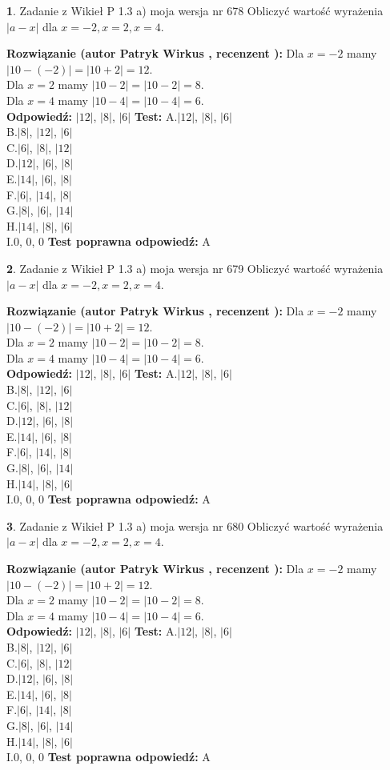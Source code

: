 \documentclass[12pt, a4paper]{article}
\theoremstyle{definition} %
\newtheorem{zad}{}
\newcommand{\zadStart}[1]{\begin{zad}#1\newline}
\newcommand{\zadStop}{\end{zad}}
\newcommand{\rozwStart}[2]{\noindent \textbf{Rozwiązanie (autor #1 , recenzent #2): }\newline}
\newcommand{\rozwStop}{\newline}
\newcommand{\odpStart}{\noindent \textbf{Odpowiedź:}\newline}
\newcommand{\odpStop}{\newline}
\newcommand{\testStart}{\noindent \textbf{Test:}\newline}
\newcommand{\testStop}{\newline}
\newcommand{\kluczStart}{\noindent \textbf{Test poprawna odpowiedź:}\newline}
\newcommand{\kluczStop}{\newline}
\begin{document}
\zadStart{Zadanie z Wikieł P 1.3 a) moja wersja nr 678}
Obliczyć wartość wyrażenia $|a - x|$ dla $x=-2,x=2,x=4$.
\zadStop
\rozwStart{Patryk Wirkus}{}
Dla $x = -2$ mamy $|10 - (-2)| = |10 + 2| = 12$.\\
Dla $x = 2$ mamy $|10 - 2| = |10 - 2| = 8$.\\
Dla $x = 4$ mamy $|10 - 4| = |10 - 4| = 6$.\\
\rozwStop
\odpStart
$|12|$, $|8|$, $|6|$
\odpStop
\testStart
A.$|12|$, $|8|$, $|6|$\\
B.$|8|$, $|12|$, $|6|$\\
C.$|6|$, $|8|$, $|12|$\\
D.$|12|$, $|6|$, $|8|$\\
E.$|14|$, $|6|$, $|8|$\\
F.$|6|$, $|14|$, $|8|$\\
G.$|8|$, $|6|$, $|14|$\\
H.$|14|$, $|8|$, $|6|$\\
I.$0$, $0$, $0$
\testStop
\kluczStart
A
\kluczStop



\zadStart{Zadanie z Wikieł P 1.3 a) moja wersja nr 679}
Obliczyć wartość wyrażenia $|a - x|$ dla $x=-2,x=2,x=4$.
\zadStop
\rozwStart{Patryk Wirkus}{}
Dla $x = -2$ mamy $|10 - (-2)| = |10 + 2| = 12$.\\
Dla $x = 2$ mamy $|10 - 2| = |10 - 2| = 8$.\\
Dla $x = 4$ mamy $|10 - 4| = |10 - 4| = 6$.\\
\rozwStop
\odpStart
$|12|$, $|8|$, $|6|$
\odpStop
\testStart
A.$|12|$, $|8|$, $|6|$\\
B.$|8|$, $|12|$, $|6|$\\
C.$|6|$, $|8|$, $|12|$\\
D.$|12|$, $|6|$, $|8|$\\
E.$|14|$, $|6|$, $|8|$\\
F.$|6|$, $|14|$, $|8|$\\
G.$|8|$, $|6|$, $|14|$\\
H.$|14|$, $|8|$, $|6|$\\
I.$0$, $0$, $0$
\testStop
\kluczStart
A
\kluczStop



\zadStart{Zadanie z Wikieł P 1.3 a) moja wersja nr 680}
Obliczyć wartość wyrażenia $|a - x|$ dla $x=-2,x=2,x=4$.
\zadStop
\rozwStart{Patryk Wirkus}{}
Dla $x = -2$ mamy $|10 - (-2)| = |10 + 2| = 12$.\\
Dla $x = 2$ mamy $|10 - 2| = |10 - 2| = 8$.\\
Dla $x = 4$ mamy $|10 - 4| = |10 - 4| = 6$.\\
\rozwStop
\odpStart
$|12|$, $|8|$, $|6|$
\odpStop
\testStart
A.$|12|$, $|8|$, $|6|$\\
B.$|8|$, $|12|$, $|6|$\\
C.$|6|$, $|8|$, $|12|$\\
D.$|12|$, $|6|$, $|8|$\\
E.$|14|$, $|6|$, $|8|$\\
F.$|6|$, $|14|$, $|8|$\\
G.$|8|$, $|6|$, $|14|$\\
H.$|14|$, $|8|$, $|6|$\\
I.$0$, $0$, $0$
\testStop
\kluczStart
A
\kluczStop
\end{document}
